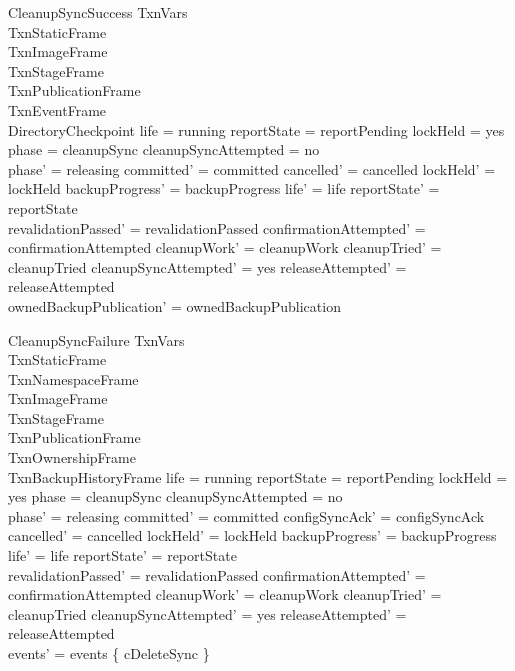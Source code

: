 \documentclass{article}
\begin{document}
\begin{schema}{CleanupSyncSuccess}
	\Delta TxnVars \\
	TxnStaticFrame \\
	TxnImageFrame \\
	TxnStageFrame \\
	TxnPublicationFrame \\
	TxnEventFrame \\
	DirectoryCheckpoint
	\where
	life = running \land reportState = reportPending \land lockHeld = yes \land
	phase = cleanupSync \land cleanupSyncAttempted = no \\
	phase' = releasing \land committed' = committed \land cancelled' = cancelled \land
	lockHeld' = lockHeld \land backupProgress' = backupProgress \land
	life' = life \land reportState' = reportState \\
	revalidationPassed' = revalidationPassed \land
	confirmationAttempted' = confirmationAttempted \land
	cleanupWork' = cleanupWork \land cleanupTried' = cleanupTried \land
	cleanupSyncAttempted' = yes \land releaseAttempted' = releaseAttempted \\
	ownedBackupPublication' = ownedBackupPublication
\end{schema}

\begin{schema}{CleanupSyncFailure}
	\Delta TxnVars \\
	TxnStaticFrame \\
	TxnNamespaceFrame \\
	TxnImageFrame \\
	TxnStageFrame \\
	TxnPublicationFrame \\
	TxnOwnershipFrame \\
	TxnBackupHistoryFrame
	\where
	life = running \land reportState = reportPending \land lockHeld = yes \land
	phase = cleanupSync \land cleanupSyncAttempted = no \\
	phase' = releasing \land committed' = committed \land
	configSyncAck' = configSyncAck \land cancelled' = cancelled \land
	lockHeld' = lockHeld \land backupProgress' = backupProgress \land
	life' = life \land reportState' = reportState \\
	revalidationPassed' = revalidationPassed \land
	confirmationAttempted' = confirmationAttempted \land
	cleanupWork' = cleanupWork \land cleanupTried' = cleanupTried \land
	cleanupSyncAttempted' = yes \land releaseAttempted' = releaseAttempted \\
	events' = events \cup \{ cDeleteSync \}
\end{schema}
\end{document}
